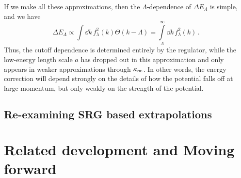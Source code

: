	If we make all these approximations, then the $\Lambda$-dependence of
	$\Delta E_{\Lambda}$ is simple, and we have
	\begin{equation}
	 \Delta E_{\Lambda} \propto \int\!\dd k\, f^2_\lambda(k)\Theta(k-\Lambda)
	 = \int\limits_\Lambda^\infty \dd k\, f^2_\lambda(k) \,.
	\label{eq:final}
	\end{equation}
	Thus, the cutoff dependence is determined entirely by the regulator,
	while the low-energy length scale $a$ has dropped out in this
	approximation and only appears in weaker approximations through
	$\kappa_{\infty}$.  In other words, the energy correction will depend strongly
	on the details of how the potential falls off at large momentum, but
	only weakly on the strength of the potential.



	\subsection{Re-examining SRG based extrapolations}


	\section{Related development and Moving forward}

	\label{sec:related_development_IR}
